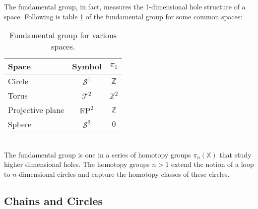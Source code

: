 The fundamental group, in fact, measures the 1-dimensional hole structure of a space.
Following is table \ref{tab:fundamental_group} of the fundamental group for some common spaces:
\begin{table}[htpb]
\medskip
\setlength{\tabcolsep}{25pt}
\renewcommand{\arraystretch}{1.25}
   \centering
\begin{tabular}{ l | c | c } \centering
	\textbf{Space}	& \textbf{Symbol}				& \textbf{$\pi_{1}$} \\ \hline \hline
	Circle			& $\mathcal{S}^{1}$			& $\mathbb{Z}$ \\
	Torus			& $\mathcal{T}^{2}$			& $\mathbb{Z}^{2}$ \\
	Projective plane	& $\mathbb{R}\mathrm{P}^{2}$	& $\mathbb{Z}$ \\
	Sphere			& $\mathcal{S}^{2}$			& $0$ \\
\end{tabular}
	\bigskip
	\caption{Fundamental group for various spaces.}
	\label{tab:fundamental_group}
\end{table}\\
The fundamental group is one in a series of homotopy groups $\pi_{n}(\mathbb{X})$ that study higher dimensional holes.
The homotopy groups $n > 1$ extend the notion of a loop to $n$-dimensional circles and capture the homotopy
classes of these circles.

\subsection{Chains and Circles}
\label{math_chainloops}

